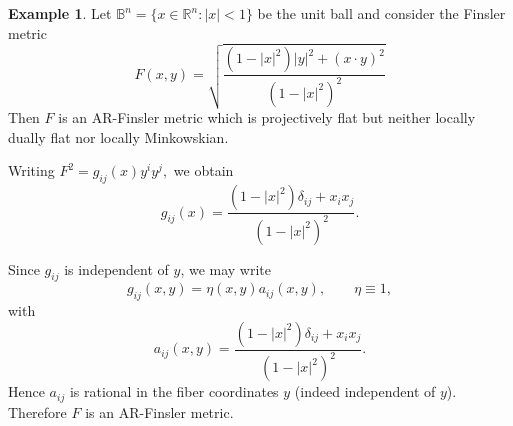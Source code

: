 \documentclass[12pt]{article}
\theoremstyle{definition}
\newtheorem{example}[theorem]{Example}
\begin{document}
									\begin{example}
										\textnormal{Let \(\mathbb{B}^{n}=\{x\in\mathbb{R}^{n}:|x|<1\}\) be the unit ball and consider the Finsler metric
											\begin{equation*}
												F(x,y)
												=
												\sqrt{
													\frac{(1-|x|^{2})|y|^{2}+(x\cdot y)^{2}}
													{(1-|x|^{2})^{2}}}    
												\end{equation*}
												Then \(F\) is an AR-Finsler metric which is projectively flat but neither locally dually flat nor locally Minkowskian.}
											\end{example}
											
											Writing $F^{2}=g_{ij}(x)y^{i}y^{j},$
											we obtain
											\begin{equation}
											g_{ij}(x)
											=
											\frac{(1-|x|^{2})\delta_{ij}+x_{i}x_{j}}
											{(1-|x|^{2})^{2}}.    
											\end{equation}
											
											Since \(g_{ij}\) is independent of \(y\), we may write
											\[
											g_{ij}(x,y)=\eta(x,y)a_{ij}(x,y),
											\qquad
											\eta\equiv 1,
											\]
											with
											\[
											a_{ij}(x,y)
											=
											\frac{(1-|x|^{2})\delta_{ij}+x_{i}x_{j}}
											{(1-|x|^{2})^{2}}.
											\]
											Hence \(a_{ij}\) is rational in the fiber coordinates \(y\) (indeed independent of \(y\)). Therefore \(F\) is an AR-Finsler metric.
											
\end{document}
